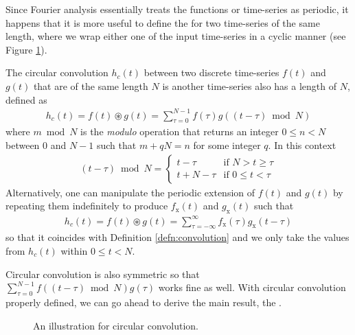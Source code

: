 Since Fourier analysis essentially treats the functions or time-series as periodic, it happens that it is more useful to define the  for two time-series of the same length, where we wrap either one of the input time-series in a cyclic manner (see Figure \ref{fig:circconvschm}).
\begin{defn}
The circular convolution $h_c(t)$ between two discrete time-series $f(t)$ and $g(t)$ that are of the same length $N$ is another time-series also has a length of $N$, defined as
\begin{align*}
h_c(t) = f(t) \circledast g(t) = \sum_{\tau=0}^{N-1} f(\tau) g((t-\tau) \bmod N)
\end{align*}
where $m \bmod N$ is the \textit{modulo} operation that returns an integer $0 \leq n < N$ between $0$ and $N-1$ such that $m + qN = n$ for some integer $q$. In this context
\begin{align*}
(t-\tau) \bmod N = 
\begin{cases}
t - \tau & \text{if $N > t \geq \tau$} \\
t + N - \tau & \text{if $0\leq t < \tau$}
\end{cases}
\end{align*}
Alternatively, one can manipulate the periodic extension of $f(t)$ and $g(t)$ by repeating them indefinitely to produce $f_\text{x}(t)$ and $g_\text{x}(t)$ such that 
\begin{align*}
h_c(t) = f(t) \circledast g(t) = \sum_{\tau=-\infty}^{\infty} f_\text{x}(\tau) g_\text{x}(t-\tau)
\end{align*}
so that it coincides with Definition \ref{defn:convolution} and we only take the values from $h_c(t)$ within $0 \leq t < N$.
\end{defn}
Circular convolution is also symmetric so that $\sum_{\tau=0}^{N-1} f((t-\tau) \bmod N) g(\tau)$ works fine as well. With circular convolution properly defined, we can go ahead to derive the main result, the .
\begin{figure}
    \centering
    \caption{An illustration for circular convolution.}
    \label{fig:circconvschm}
\end{figure}
